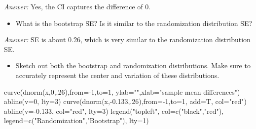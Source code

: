 \documentclass[
]{book}
\newenvironment{Shaded}{\begin{snugshade}}{\end{snugshade}}
\newcommand{\AttributeTok}[1]{\textcolor[rgb]{0.77,0.63,0.00}{#1}}
\newcommand{\DecValTok}[1]{\textcolor[rgb]{0.00,0.00,0.81}{#1}}
\newcommand{\FloatTok}[1]{\textcolor[rgb]{0.00,0.00,0.81}{#1}}
\newcommand{\FunctionTok}[1]{\textcolor[rgb]{0.00,0.00,0.00}{#1}}
\newcommand{\NormalTok}[1]{#1}
\newcommand{\SpecialCharTok}[1]{\textcolor[rgb]{0.00,0.00,0.00}{#1}}
\newcommand{\StringTok}[1]{\textcolor[rgb]{0.31,0.60,0.02}{#1}}
\providecommand{\tightlist}{%
  \setlength{\itemsep}{0pt}\setlength{\parskip}{0pt}}
\begin{document}
\emph{Answer:} Yes, the CI captures the difference of 0.

\begin{itemize}
\tightlist
\item
  What is the bootstrap SE? Is it similar to the randomization distribution SE?
  \vspace*{.5in}
\end{itemize}

\emph{Answer:} SE is about 0.26, which is very similar to the randomization distribution SE.

\begin{itemize}
\tightlist
\item
  Sketch out both the bootstrap and randomization distributions. Make sure to accurately represent the center and variation of these distributions.
\end{itemize}

\begin{Shaded}
\begin{Highlighting}[]
\FunctionTok{curve}\NormalTok{(}\FunctionTok{dnorm}\NormalTok{(x,}\DecValTok{0}\NormalTok{,.}\DecValTok{26}\NormalTok{),}\AttributeTok{from=}\SpecialCharTok{{-}}\DecValTok{1}\NormalTok{,}\AttributeTok{to=}\DecValTok{1}\NormalTok{, }\AttributeTok{ylab=}\StringTok{""}\NormalTok{,}\AttributeTok{xlab=}\StringTok{"sample mean differences"}\NormalTok{)}
\FunctionTok{abline}\NormalTok{(}\AttributeTok{v=}\DecValTok{0}\NormalTok{, }\AttributeTok{lty=}\DecValTok{3}\NormalTok{)}
\FunctionTok{curve}\NormalTok{(}\FunctionTok{dnorm}\NormalTok{(x,}\SpecialCharTok{{-}}\FloatTok{0.133}\NormalTok{,.}\DecValTok{26}\NormalTok{),}\AttributeTok{from=}\SpecialCharTok{{-}}\DecValTok{1}\NormalTok{,}\AttributeTok{to=}\DecValTok{1}\NormalTok{, }\AttributeTok{add=}\NormalTok{T, }\AttributeTok{col=}\StringTok{"red"}\NormalTok{)}
\FunctionTok{abline}\NormalTok{(}\AttributeTok{v=}\SpecialCharTok{{-}}\FloatTok{0.133}\NormalTok{, }\AttributeTok{col=}\StringTok{"red"}\NormalTok{, }\AttributeTok{lty=}\DecValTok{3}\NormalTok{)}
\FunctionTok{legend}\NormalTok{(}\StringTok{"topleft"}\NormalTok{, }\AttributeTok{col=}\FunctionTok{c}\NormalTok{(}\StringTok{"black"}\NormalTok{,}\StringTok{"red"}\NormalTok{), }\AttributeTok{legend=}\FunctionTok{c}\NormalTok{(}\StringTok{"Randomization"}\NormalTok{,}\StringTok{"Bootstrap"}\NormalTok{), }\AttributeTok{lty=}\DecValTok{1}\NormalTok{)}
\end{Highlighting}
\end{Shaded}
\end{document}
